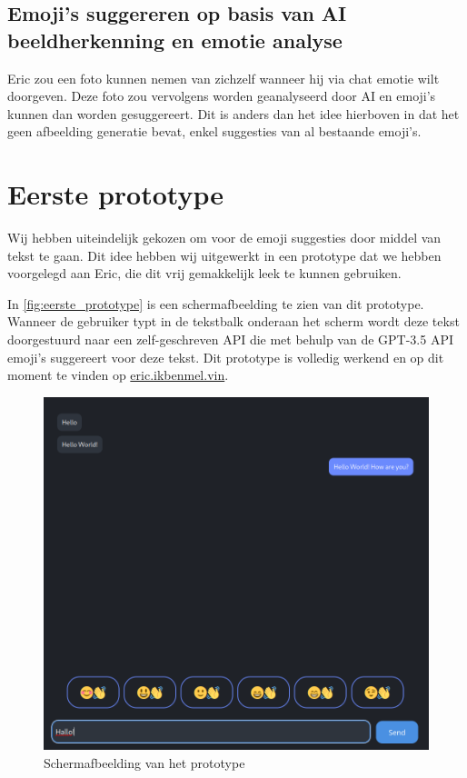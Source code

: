 \documentclass[12pt]{article}
\begin{document}
\subsection{Emoji's suggereren op basis van AI beeldherkenning en emotie analyse}

Eric zou een foto kunnen nemen van zichzelf wanneer hij via chat emotie wilt doorgeven.
Deze foto zou vervolgens worden geanalyseerd door AI en emoji's kunnen dan worden gesuggereert.
Dit is anders dan het idee hierboven in dat het geen afbeelding generatie bevat, enkel suggesties van al bestaande emoji's.

\clearpage\section{Eerste prototype}

Wij hebben uiteindelijk gekozen om voor de emoji suggesties door middel van tekst te gaan.
Dit idee hebben wij uitgewerkt in een prototype dat we hebben voorgelegd aan Eric, die dit vrij gemakkelijk leek te kunnen gebruiken.

\def\figureautorefname{figuur}
In \autoref{fig:eerste_prototype} is een schermafbeelding te zien van dit prototype.
Wanneer de gebruiker typt in de tekstbalk onderaan het scherm wordt deze tekst doorgestuurd naar een zelf-geschreven API die met behulp van de GPT-3.5 API emoji's suggereert voor deze tekst.
Dit prototype is volledig werkend en op dit moment te vinden op \href{https://eric.ikbenmel.vin}{eric.ikbenmel.vin}.

\begin{figure}[h]
	\centering
	\includegraphics[width=1\textwidth]{eerste_prototype_1}
	\caption{Schermafbeelding van het prototype}
	\label{fig:eerste_prototype}
\end{figure}
\end{document}
